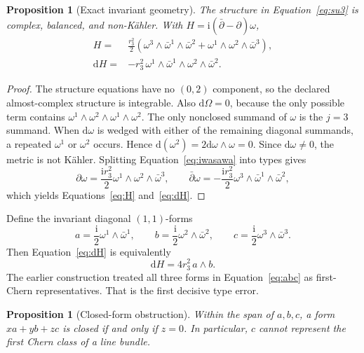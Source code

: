 \documentclass[11pt]{article}
\newcommand{\ii}{\mathrm{i}}
\newcommand{\dd}{\mathrm{d}}
\newtheorem{proposition}[theorem]{Proposition}
\theoremstyle{definition}
\theoremstyle{remark}
\begin{document}
\begin{proposition}[Exact invariant geometry]
\label{prop:geometry}
The structure in Equation~\eqref{eq:su3} is complex, balanced, and
non-K\"ahler.  With \(H=\ii(\bar\partial-\partial)\omega\),
\begin{align}
H={}&\frac{r_3^2}{2}\left(
\omega^3\wedge\bar\omega^1\wedge\bar\omega^2
+\omega^1\wedge\omega^2\wedge\bar\omega^3\right),
\label{eq:H}\\
\dd H={}&-r_3^2\,
\omega^1\wedge\bar\omega^1\wedge
\omega^2\wedge\bar\omega^2.
\label{eq:dH}
\end{align}
\end{proposition}

\begin{proof}
The structure equations have no \((0,2)\) component, so the declared
almost-complex structure is integrable.  Also \(\dd\Omega=0\), because the
only possible term contains
\(\omega^1\wedge\omega^2\wedge\omega^1\wedge\omega^2\).
The only nonclosed summand of \(\omega\) is the \(j=3\) summand.
When \(\dd\omega\) is wedged with either of the remaining diagonal summands,
a repeated \(\omega^1\) or \(\omega^2\) occurs.  Hence
\(\dd(\omega^2)=2\dd\omega\wedge\omega=0\).
Since \(\dd\omega\neq0\), the metric is not K\"ahler.  Splitting
Equation~\eqref{eq:iwasawa} into types gives
\[
\partial\omega=\frac{\ii r_3^2}{2}
\omega^1\wedge\omega^2\wedge\bar\omega^3,\qquad
\bar\partial\omega=-\frac{\ii r_3^2}{2}
\omega^3\wedge\bar\omega^1\wedge\bar\omega^2,
\]
which yields Equations~\eqref{eq:H} and~\eqref{eq:dH}.
\end{proof}

Define the invariant diagonal \((1,1)\)-forms
\begin{equation}
a=\frac{\ii}{2}\omega^1\wedge\bar\omega^1,\qquad
b=\frac{\ii}{2}\omega^2\wedge\bar\omega^2,\qquad
c=\frac{\ii}{2}\omega^3\wedge\bar\omega^3.
\label{eq:abc}
\end{equation}
Then Equation~\eqref{eq:dH} is equivalently
\begin{equation}
\dd H=4r_3^2\,a\wedge b.
\label{eq:dHab}
\end{equation}
The earlier construction treated all three forms in
Equation~\eqref{eq:abc} as first-Chern representatives.  That is the first
decisive type error.

\begin{proposition}[Closed-form obstruction]
\label{prop:closed}
Within the span of \(a,b,c\), a form \(x a+y b+z c\) is closed if and only if
\(z=0\).  In particular, \(c\) cannot represent the first Chern class of a
line bundle.
\end{proposition}
\end{document}
